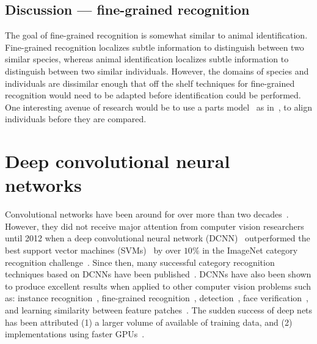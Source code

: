     \subsection{Discussion --- fine-grained recognition}
        The goal of fine-grained recognition is somewhat similar to animal identification. Fine-grained recognition
        localizes subtle information to distinguish between two similar species, whereas animal identification
        localizes subtle information to distinguish between two similar individuals. However, the domains of
        species and individuals are dissimilar enough that off the shelf techniques for fine-grained recognition
        would need to be adapted before identification could be performed. One interesting avenue of research would
        be to use a parts model~\cite{felzenszwalb_object_2010} as in~\cite{gavves_local_2014}, to align
        individuals before they are compared.


\section{Deep convolutional neural networks}\label{sec:dcnn}
    Convolutional networks have been around for over more than two decades~\cite{lecun_gradient_based_1998,
    fukushima_neocognitron_1988}. However, they did not receive major attention from computer vision researchers
    until 2012 when a deep convolutional neural network (DCNN)~\cite{krizhevsky_imagenet_2012} outperformed the
    best support vector machines (SVMs)~\cite{vapnik_statistical_1998} by over $10\percent$ in the ImageNet
    category recognition challenge~\cite{russakovsky_imagenet_2014}. Since then, many successful category
    recognition techniques based on DCNNs have been published~\cite{simonyan_very_2015, chatfield_efficient_2015,
    chatfield_return_2014, oquab_learning_2014, szegedy_going_2015, long_convnets_2014, he_spatial_2014,
    dean_fast_2013}. DCNNs have also been shown to produce excellent results when applied to other computer vision
    problems such as: %
    instance recognition~\cite{razavian_cnn_2014, razavian_baseline_2015, liu_learning_2015,
    held_deep_2015,arandjelovic_netvlad_2016,radenovic_cnn_2016}, %
    fine-grained recognition~\cite{branson_bird_2014, donahue_decaf_2014, catherine_wah_similarity_2014}, %
    detection~\cite{girshick_rich_2014, sermanet_overfeat_2013, li_wan_end_end_2015}, %
    face verification~\cite{huang_learning_2012, taigman_deepface_2014, sun_deep_2013}, %
    and learning similarity between feature patches~\cite{osendorfer_convolutional_2013, han_matchnet_2015,
    ng_exploiting_2015, zagoruyko_learning_2015, han_matchnet_2015}. The sudden success of deep nets has been
    attributed (1) a larger volume of available of training data, and (2) implementations using faster
    GPUs~\cite{krizhevsky_imagenet_2012}.
      
